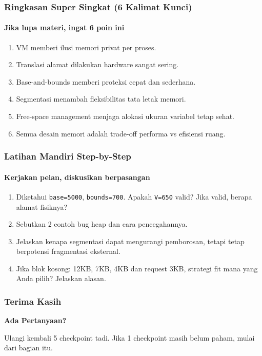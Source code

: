 \documentclass[t,aspectratio=169,xcolor=dvipsnames]{beamer}
\begin{document}
\begin{frame}
    \frametitle{Ringkasan Super Singkat (6 Kalimat Kunci)}
    \framesubtitle{Jika lupa materi, ingat 6 poin ini}
    \small
    \begin{enumerate}
        \item VM memberi ilusi memori privat per proses.
        \item Translasi alamat dilakukan hardware sangat sering.
        \item Base-and-bounds memberi proteksi cepat dan sederhana.
        \item Segmentasi menambah fleksibilitas tata letak memori.
        \item Free-space management menjaga alokasi ukuran variabel tetap sehat.
        \item Semua desain memori adalah trade-off performa vs efisiensi ruang.
    \end{enumerate}
\end{frame}

\begin{frame}
    \frametitle{Latihan Mandiri Step-by-Step}
    \framesubtitle{Kerjakan pelan, diskusikan berpasangan}
    \small
    \begin{enumerate}
        \item Diketahui \texttt{base=5000}, \texttt{bounds=700}. Apakah \texttt{V=650} valid? Jika valid, berapa alamat fisiknya?
        \item Sebutkan 2 contoh bug heap dan cara pencegahannya.
        \item Jelaskan kenapa segmentasi dapat mengurangi pemborosan, tetapi tetap berpotensi fragmentasi eksternal.
        \item Jika blok kosong: 12KB, 7KB, 4KB dan request 3KB, strategi fit mana yang Anda pilih? Jelaskan alasan.
    \end{enumerate}
\end{frame}

\begin{frame}
    \frametitle{Terima Kasih}
    \begin{center}
        \Huge \textbf{Ada Pertanyaan?}

        \vspace{0.8cm}
        \normalsize
        Ulangi kembali 5 checkpoint tadi. Jika 1 checkpoint masih belum paham, mulai dari bagian itu.
    \end{center}
\end{frame}
\end{document}
